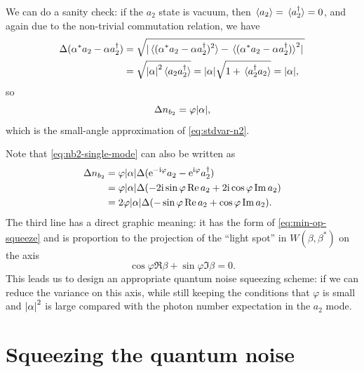 \documentclass[hyperref, a4paper]{article}
\newcommand*{\ii}{\mathrm{i}}
\newcommand*{\ee}{\mathrm{e}}
\begin{document}
We can do a sanity check:
if the $a_2$ state is vacuum,
then $\expval*{a_2} = \expval*{a_2^\dagger} = 0$, 
and again due to the non-trivial commutation relation, we have 
\begin{equation}
    \begin{aligned}
        \Delta (\alpha^* a_2 - \alpha a_2^\dagger)
        &= \sqrt{ \abs*{\expval*{ (\alpha^* a_2 - \alpha a_2^\dagger)^2 } 
        - \expval*{(\alpha^* a_2 - \alpha a_2^\dagger)}^2} } \\
        &= \sqrt{
            \abs{\alpha}^2 \expval*{a_2 a_2^\dagger}
        } 
        = \abs{\alpha} \sqrt{ 1 + \expval*{a^\dagger_2 a_2} } = \abs{\alpha},
    \end{aligned}
\end{equation}
so 
\begin{equation}
    \Delta n_{b_2} = \varphi \abs{\alpha},
\end{equation}
which is the small-angle approximation of \eqref{eq:stdvar-n2}.

Note that \eqref{eq:nb2-single-mode} can also be written as  
\begin{equation}
    \begin{aligned}
        \Delta n_{b_2} &= \varphi \abs{\alpha} \Delta (\ee^{- \ii \varphi} a_2 - \ee^{\ii \varphi} a_2^\dagger)  \\
        &= \varphi \abs{\alpha} \Delta ( - 2 \ii \sin \varphi \Re a_2 + 2 \ii \cos \varphi \Im a_2 ) \\
        &= 2 \varphi \abs{\alpha} \Delta (- \sin \varphi \Re a_2 + \cos \varphi \Im a_2 ).
    \end{aligned}
\end{equation}
The third line has a direct graphic meaning:
it has the form of \eqref{eq:min-op-squeeze}
and is proportion to the projection of the ``light spot'' in $W(\beta, \beta^*)$
on the axis 
\begin{equation}
    \cos \varphi \Re \beta + \sin \varphi \Im \beta = 0.
    \label{eq:measure-axis}
\end{equation}
This leads us to design an appropriate quantum noise squeezing scheme:
if we can reduce the variance on this axis,
while still keeping the conditions that $\varphi$ is small and 
$\abs{\alpha}^2$ is large compared with the photon number expectation in the $a_2$ mode.

\section{Squeezing the quantum noise}\label{sec:squeezing}
\end{document}
